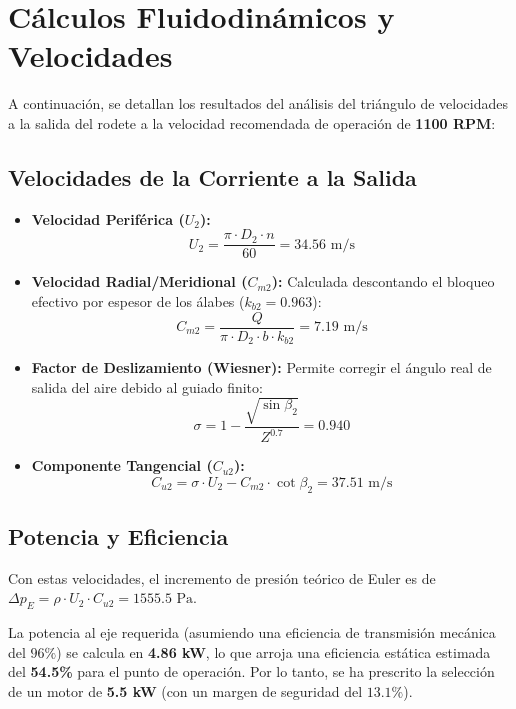 \documentclass[12pt,a4paper]{article}
\begin{document}
\section{Cálculos Fluidodinámicos y Velocidades}
A continuación, se detallan los resultados del análisis del triángulo de velocidades a la salida del rodete a la velocidad recomendada de operación de \textbf{1100 RPM}:

\subsection{Velocidades de la Corriente a la Salida}
\begin{itemize}
    \item \textbf{Velocidad Periférica ($U_2$):} 
    \begin{equation}
        U_2 = \frac{\pi \cdot D_2 \cdot n}{60} = 34.56\text{ m/s}
    \end{equation}
    \item \textbf{Velocidad Radial/Meridional ($C_{m2}$):} Calculada descontando el bloqueo efectivo por espesor de los álabes ($k_{b2} = 0.963$):
    \begin{equation}
        C_{m2} = \frac{Q}{\pi \cdot D_2 \cdot b \cdot k_{b2}} = 7.19\text{ m/s}
    \end{equation}
    \item \textbf{Factor de Deslizamiento (Wiesner):} Permite corregir el ángulo real de salida del aire debido al guiado finito:
    \begin{equation}
        \sigma = 1 - \frac{\sqrt{\sin\beta_2}}{Z^{0.7}} = 0.940
    \end{equation}
    \item \textbf{Componente Tangencial ($C_{u2}$):}
    \begin{equation}
        C_{u2} = \sigma \cdot U_2 - C_{m2} \cdot \cot\beta_2 = 37.51\text{ m/s}
    \end{equation}
\end{itemize}

\subsection{Potencia y Eficiencia}
Con estas velocidades, el incremento de presión teórico de Euler es de $\Delta p_E = \rho \cdot U_2 \cdot C_{u2} = 1555.5\text{ Pa}$. 

La potencia al eje requerida (asumiendo una eficiencia de transmisión mecánica del $96\%$) se calcula en \textbf{4.86 kW}, lo que arroja una eficiencia estática estimada del \textbf{54.5\%} para el punto de operación. Por lo tanto, se ha prescrito la selección de un motor de \textbf{5.5 kW} (con un margen de seguridad del $13.1\%$).
\end{document}
